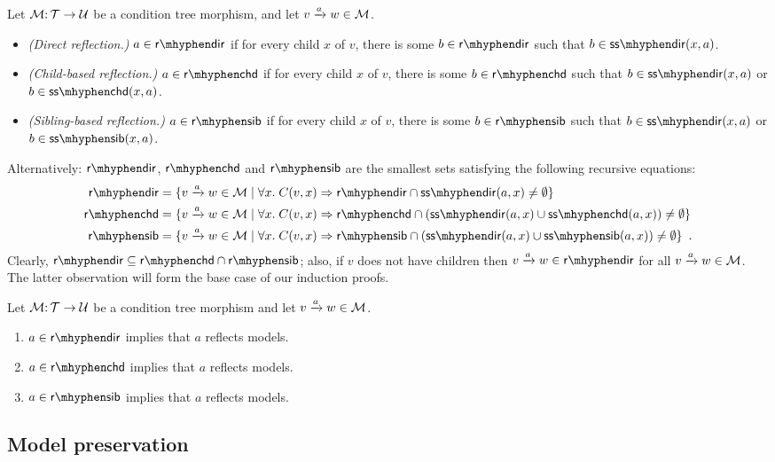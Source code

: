 \begin{definition}\label{def:syntactic reflection}
Let ${\mathcal{M}}{:}\, {\mathcal{T}}\rightarrow{\mathcal{U}}$ be a condition tree morphism, and let ${v}\xrightarrow{a}{w}\in{\mathcal{M}}$.
\begin{itemize}[topsep=\smallskipamount]
\item \emph{(Direct reflection.)} $a\in\rdir$ if for every child $x$ of $v$, there is some $b\in\rdir$ such that $\issdir b{x,a}$.
\item \emph{(Child-based reflection.)} $a\in\rchd$ if for every child $x$ of $v$, there is some $b\in\rchd$ such that $\issdir b{x,a}$ or $\isschd b{x,a}$.
\item \emph{(Sibling-based reflection.)} $a\in\rsib$ if for every child $x$ of $v$, there is some $b\in \rsib$ such that $\issdir b{x,a}$ or $\isssib b{x,a}$.
\end{itemize}
\end{definition}
%
Alternatively: $\rdir$, $\rchd$ and $\rsib$ are the smallest sets satisfying the following recursive equations:
\begin{align*}
	\rdir ={} & \gensetof{\trip vaw\in \cM}{\forall x\st C(v,x) \Rightarrow \rdir \cap \sdir{a,x}\neq\emptyset} \\
	\rchd ={} &\gensetof{\trip vaw\in \cM}{\forall x\st C(v,x) \Rightarrow \rchd \cap (\sdir{a,x}\cup \schd{a,x}) \neq\emptyset} \\
	\rsib ={} &\gensetof{\trip vaw\in \cM}{\forall x\st C(v,x) \Rightarrow \rsib \cap (\sdir{a,x}\cup \ssib{a,x}) \neq\emptyset} \enspace.
\end{align*}
%
Clearly, $\rdir\subseteq \rchd\cap \rsib$; also, if $v$ does not have children then $\trip vaw\in \rdir$ for all ${v}\xrightarrow{a}{w}\in{\mathcal{M}}$. The latter observation will form the base case of our induction proofs.

\begin{lemma}\label{lem:reflection}
Let ${\mathcal{M}}{:}\,{\mathcal{T}}\rightarrow{\mathcal{U}}$ be a condition tree morphism and let ${v}\xrightarrow{a}{w}\in{\mathcal{M}}$.
\begin{enumerate}[topsep=\smallskipamount]
\item $a\in\rdir$ implies that $a$ reflects models. 
\item $a\in\rchd$ implies that $a$ reflects models. 
\item $a\in\rsib$ implies that $a$ reflects models.
\end{enumerate}
\end{lemma}

\subsection{Model preservation}

